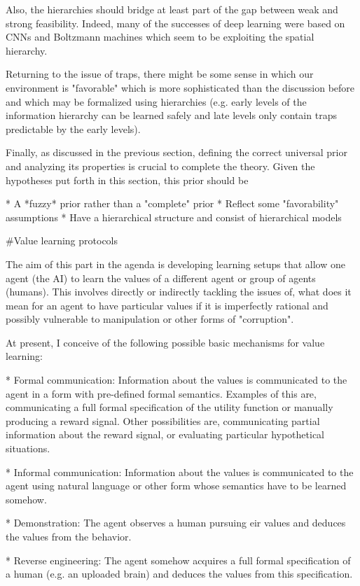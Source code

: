 \documentclass[a4paper]{article}
\begin{document}
Also, the hierarchies should bridge at least part of the gap between weak and strong feasibility. Indeed, many of the successes of deep learning were based on CNNs and Boltzmann machines which seem to be exploiting the spatial hierarchy.

Returning to the issue of traps, there might be some sense in which our environment is "favorable" which is more sophisticated than the discussion before and which may be formalized using hierarchies (e.g. early levels of the information hierarchy can be learned safely and late levels only contain traps predictable by the early levels).

Finally, as discussed in the previous section, defining the correct universal prior and analyzing its properties is crucial to complete the theory. Given the hypotheses put forth in this section, this prior should be

* A *fuzzy* prior rather than a "complete" prior
* Reflect some "favorability" assumptions
* Have a hierarchical structure and consist of hierarchical models

\#Value learning protocols

The aim of this part in the agenda is developing learning setups that allow one agent (the AI) to learn the values of a different agent or group of agents (humans). This involves directly or indirectly tackling the issues of, what does it mean for an agent to have particular values if it is imperfectly rational and possibly vulnerable to manipulation or other forms of "corruption".

At present, I conceive of the following possible basic mechanisms for value learning:

* Formal communication: Information about the values is communicated to the agent in a form with pre-defined formal semantics. Examples of this are, communicating a full formal specification of the utility function or manually producing a reward signal. Other possibilities are, communicating partial information about the reward signal, or evaluating particular hypothetical situations.

* Informal communication: Information about the values is communicated to the agent using natural language or other form whose semantics have to be learned somehow.

* Demonstration: The agent observes a human pursuing eir values and deduces the values from the behavior.

* Reverse engineering: The agent somehow acquires a full formal specification of a human (e.g. an uploaded brain) and deduces the values from this specification.
\end{document}
